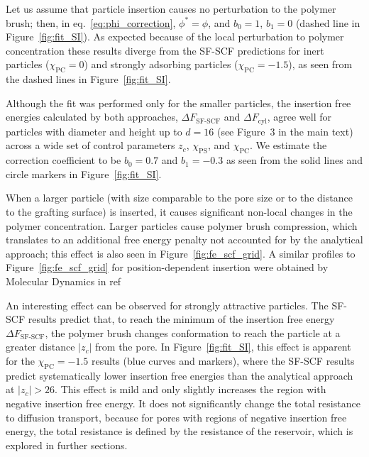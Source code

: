 \documentclass[10pt, a4paper]{article}
\begin{document}
\begin{multicols}{2}
Let us assume that particle insertion causes no perturbation to the polymer brush; then, in eq.~\ref{eq:phi_correction}, $\phi^{\ast} = \phi$, and $b_0 = 1$, $b_1 = 0$ (dashed line in Figure~\ref{fig:fit_SI}).
As expected because of the local perturbation to polymer concentration these results diverge from the SF-SCF predictions for inert particles ($\chi_{\text{PC}} = 0$) and strongly adsorbing particles ($\chi_{\text{PC}} = -1.5$), as seen from the dashed lines in Figure~\ref{fig:fit_SI}.


Although the fit was performed only for the smaller particles, the insertion free energies calculated by both approaches, $\Delta F_{\text{SF-SCF}}$ and $\Delta F_{\text{cyl}}$, agree well for particles with diameter and height up to $d = 16$ (see Figure~3 in the main text) across a wide set of control parameters $z_c$, $\chi_{\text{PS}}$, and $\chi_{\text{PC}}$.
We estimate the correction coefficient to be $b_0=0.7$ and $b_1 = -0.3$ as seen from the solid lines and circle markers in Figure~\ref{fig:fit_SI}.

When a larger particle (with size comparable to the pore size or to the distance to the grafting surface) is inserted, it causes significant non-local changes in the polymer concentration.
Larger particles cause polymer brush compression, which translates to an additional free energy penalty not accounted for by the analytical approach; this effect is also seen in Figure~\ref{fig:fe_scf_grid}.
A similar profiles to Figure~\ref{fig:fe_scf_grid} for position-dependent insertion were obtained by Molecular Dynamics in ref 

An interesting effect can be observed for strongly attractive particles.
The SF-SCF results predict that, to reach the minimum of the insertion free energy $\Delta F_{\text{SF-SCF}}$, the polymer brush changes conformation to reach the particle at a greater distance $|z_c|$ from the pore.
In Figure~\ref{fig:fit_SI}, this effect is apparent for the $\chi_{\text{PC}} = -1.5$ results (blue curves and markers), where the SF-SCF results predict systematically lower insertion free energies than the analytical approach at $|z_c| > 26$.
This effect is mild and only slightly increases the region with negative insertion free energy.
It does not significantly change the total resistance to diffusion transport, because for pores with regions of negative insertion free energy, the total resistance is defined by the resistance of the reservoir, which is explored in further sections.


\end{multicols}
\end{document}
